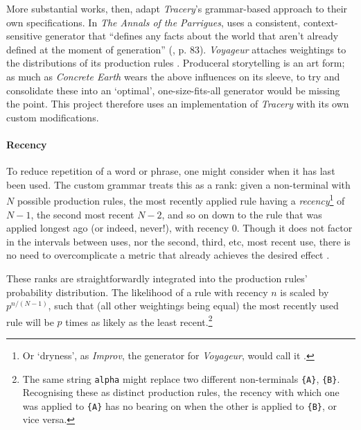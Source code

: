 \documentclass[a4paper, 11pt]{article}
\begin{document}
\begin{flushleft}
\vspace{5pt}\noindent
More substantial works, then, adapt \textit{Tracery}'s grammar-based approach to their own specifications. In \textit{The Annals of the Parrigues}, \citeauthor{shortParrigues} uses a consistent, context-sensitive generator that ``defines any facts about the world that aren’t already defined at the moment of generation'' (\citeyear{shortParrigues}, p. 83). \textit{Voyageur} \citep{diasVoyageur} attaches weightings to the distributions of its production rules \citep{diasVoyageurDescriptions}. Produceral storytelling is an art form; as much as \textit{Concrete Earth} wears the above influences on its sleeve, to try and consolidate these into an `optimal', one-size-fits-all generator would be missing the point. This project therefore uses an implementation of \textit{Tracery} with its own custom modifications.

\paragraph{Recency} To reduce repetition of a word or phrase, one might consider when it has last been used. The custom grammar treats this as a rank: given a non-terminal with $N$ possible production rules, the most recently applied rule having a \textit{recency}\footnote{Or `dryness', as \textit{Improv}, the generator for \textit{Voyageur}, would call it \citep{diasVoyageurDescriptions}.} of $N-1$, the second most recent $N-2$, and so on down to the rule that was applied longest ago (or indeed, never!), with recency $0$. Though it does not factor in the intervals between uses, nor the second, third, etc, most recent use, there is no need to overcomplicate a metric that already achieves the desired effect \citep{kazemiSimpleProceduralGeneration}.

\vspace{5pt}\noindent
These ranks are straightforwardly integrated into the production rules' probability distribution. The likelihood of a rule with recency $n$ is scaled by $p^{n/(N-1)}$, such that (all other weightings being equal) the most recently used rule will be $p$ times as likely as the least recent.\footnote{The same string \texttt{alpha} might replace two different non-terminals \texttt{\{A\}}, \texttt{\{B\}}. Recognising these as distinct production rules, the recency with which one was applied to \texttt{\{A\}} has no bearing on when the other is applied to \texttt{\{B\}}, or vice versa.} 



\end{flushleft}
\end{document}
